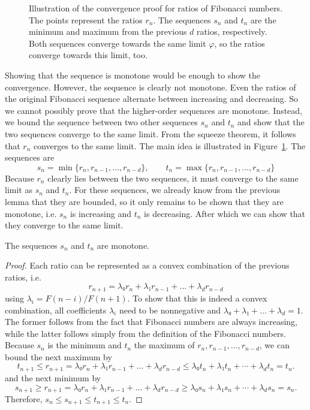 \begin{figure}[tbp]
  \centering
  
  \caption{
    Illustration of the convergence proof for ratios of Fibonacci numbers.
    The points represent the ratios $r_n$.
    The sequences $s_n$ and $t_n$ are the minimum and maximum from the previous
    $d$ ratios, respectively.
    Both sequences converge towards the same limit $φ$, so the ratios converge
    towards this limit, too.
  }
  \label{fig:fibonacci-convergence}
\end{figure}

Showing that the sequence is monotone would be enough to show the convergence.
However, the sequence is clearly not monotone.
Even the ratios of the original Fibonacci sequence alternate between increasing
and decreasing.
So we cannot possibly prove that the higher-order sequences are monotone.
Instead, we bound the sequence between two other sequences $s_n$ and $t_n$
and show that the two sequences converge to the same limit.
From the squeeze theorem, it follows that $r_n$ converges to the same limit.
The main idea is illustrated in Figure~\ref{fig:fibonacci-convergence}.
The sequences are
\[
  s_n = \min\{r_n, r_{n-1}, …, r_{n-d} \}, \qquad t_n = \max\{r_n, r_{n-1}, …, r_{n-d}\}
\]
Because $r_n$ clearly lies between the two sequences, it must converge to the same limit as $s_n$ and $t_n$.
For these sequences, we already know from the previous lemma that they are bounded,
so it only remains to be shown that they are monotone,
i.e. $s_n$ is increasing and $t_n$ is decreasing.
After which we can show that they converge to the same limit.

\begin{lemma}
  The sequences $s_n$ and $t_n$ are monotone.
\end{lemma}

\begin{proof}
  Each ratio can be represented as a convex combination of the previous ratios, i.e.
  \[
    r_{n+1} = λ₀ r_n + λ₁ r_{n-1} + \dots + λ_d r_{n-d}
  \]
  using $λ_i = F(n - i) / F(n + 1)$.
  To show that this is indeed a convex combination, all coefficients $λ_i$
  need to be nonnegative and $λ₀ + λ₁ + \dots + \lambda_d = 1$.
  The former follows from the fact that Fibonacci numbers are always increasing,
  while the latter follows simply from the definition of the Fibonacci numbers.
  Because $s_n$ is the minimum and $t_n$ the maximum of $r_n, r_{n-1}, …, r_{n-d}$,
  we can bound the next maximum by
  \[
    t_{n+1} ≤ r_{n+1} = λ₀ r_n + λ₁ r_{n-1} + \dots + λ_d r_{n-d} ≤ λ₀ t_n + λ₁ t_n + ⋯ + λ_d t_n = t_n.
  \]
  and the next minimum by
  \[
    s_{n+1} ≥ r_{n+1} = λ₀ r_n + λ₁ r_{n-1} + \dots + λ_d r_{n-d} ≥ λ₀ s_n + λ₁ s_n + ⋯ + λ_d s_n = s_n.
  \]
  Therefore, $s_n ≤ s_{n+1} ≤ t_{n+1} ≤ t_n$.
\end{proof}

